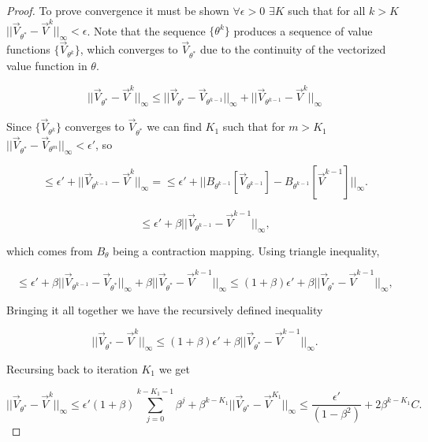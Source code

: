 \documentclass[letterpaper, 10 pt, conference]{ieeeconf}
\begin{document}
\begin{proof}
To prove convergence it must be shown $\forall \epsilon>0$ $\exists K$ such that for all $k>K$ $||\vec{V}_{\theta^*}-\vec{V}^{k}||_{\infty}< \epsilon$. Note that the sequence $\{\theta^k\}$ produces a sequence of value functions $\{\vec{V}_{\theta^k}\}$, which converges to $\vec{V}_{\theta^*}$ due to the continuity of the vectorized value function in $\theta$.

\begin{equation*}
||\vec{V}_{\theta^*}-\vec{V}^{k}||_{\infty} \leq ||\vec{V}_{\theta^*}-\vec{V}_{\theta^{k-1}}||_{\infty} + ||\vec{V}_{\theta^{k-1}}-\vec{V}^{k}||_{\infty}
\end{equation*}

\noindent Since $\{\vec{V}_{\theta^k}\}$ converges to $\vec{V}_{\theta^*}$ we can find $K_1$ such that for $m>K_1$ $||\vec{V}_{\theta^*}-\vec{V}_{\theta^{m}}||_{\infty} < \epsilon'$, so

\begin{equation*}
\leq \epsilon' + ||\vec{V}_{\theta^{k-1}}-\vec{V}^{k}||_{\infty} = \leq \epsilon' + ||B_{\theta^{k-1}}[\vec{V}_{\theta^{k-1}}]-B_{\theta^{k-1}}[\vec{V}^{k-1}]||_{\infty}.
\end{equation*}

\begin{equation*}
\leq \epsilon' + \beta ||\vec{V}_{\theta^{k-1}}-\vec{V}^{k-1}||_{\infty},
\end{equation*}

\noindent which comes from $B_{\theta}$ being a contraction mapping. Using triangle inequality,

\begin{equation*}
\leq \epsilon' + \beta ||\vec{V}_{\theta^{k-1}}-\vec{V}_{\theta^{*}}||_{\infty} + \beta ||\vec{V}_{\theta^{*}}-\vec{V}^{k-1}||_{\infty} \leq (1+\beta)\epsilon' + \beta ||\vec{V}_{\theta^{*}}-\vec{V}^{k-1}||_{\infty},
\end{equation*}

\noindent Bringing it all together we have the recursively defined inequality

\begin{equation*}
||\vec{V}_{\theta^*}-\vec{V}^{k}||_{\infty}\leq (1+\beta)\epsilon' + \beta ||\vec{V}_{\theta^{*}}-\vec{V}^{k-1}||_{\infty}.
\end{equation*}

\noindent Recursing back to iteration $K_1$ we get 

\begin{equation*}
||\vec{V}_{\theta^*}-\vec{V}^{k}||_{\infty}\leq \epsilon'(1+\beta) \sum_{j=0}^{k-K_1-1} \beta^j + \beta^{k-K_1} ||\vec{V}_{\theta^{*}}-\vec{V}^{K_1}||_{\infty}\leq \frac{\epsilon' }{(1-\beta^2)} + 2\beta^{k-K_1} C .
\end{equation*}


\end{proof}
\end{document}
